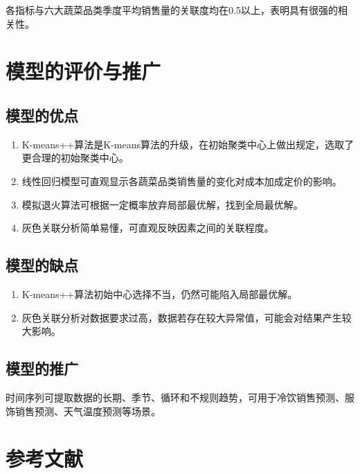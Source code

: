 \documentclass[a4paper,12pt]{article}
\begin{document}
	各指标与六大蔬菜品类季度平均销售量的关联度均在0.5以上，表明具有很强的相关性。
	
	\newpage
	
	\section{模型的评价与推广}
	
	\subsection{模型的优点}
	
	\begin{enumerate}
		\item K-means++算法是K-means算法的升级，在初始聚类中心上做出规定，选取了更合理的初始聚类中心。
		\item 线性回归模型可直观显示各蔬菜品类销售量的变化对成本加成定价的影响。
		\item 模拟退火算法可根据一定概率放弃局部最优解，找到全局最优解。
		\item 灰色关联分析简单易懂，可直观反映因素之间的关联程度。
	\end{enumerate}
	
	\subsection{模型的缺点}
	
	\begin{enumerate}
		\item K-means++算法初始中心选择不当，仍然可能陷入局部最优解。
		\item 灰色关联分析对数据要求过高，数据若存在较大异常值，可能会对结果产生较大影响。
	\end{enumerate}
	
	\subsection{模型的推广}
	
	时间序列可提取数据的长期、季节、循环和不规则趋势，可用于冷饮销售预测、服饰销售预测、天气温度预测等场景。
	
	\newpage
	
	\section{参考文献}
	
\end{document}
